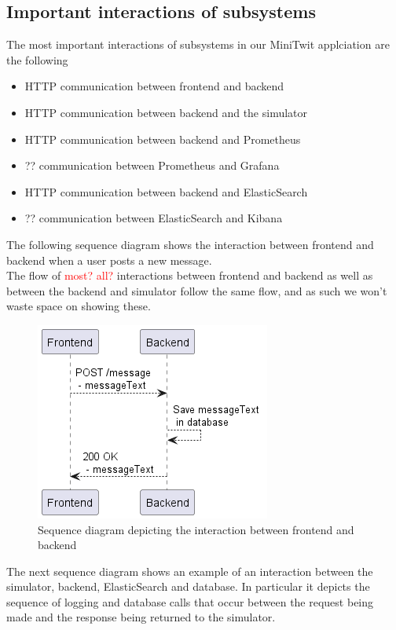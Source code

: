 \subsection{Important interactions of subsystems}
The most important interactions of subsystems in our MiniTwit applciation are the following 
\begin{itemize}
    \item HTTP communication between frontend and backend
    \item HTTP communication between backend and the simulator
    \item HTTP communication between backend and Prometheus
    \item ?? communication between Prometheus and Grafana
    \item HTTP communication between backend and ElasticSearch
    \item ?? communication between ElasticSearch and Kibana
\end{itemize}

The following sequence diagram shows the interaction between frontend and backend when a user posts a new message. \\
The flow of \textcolor{red}{most? all?} interactions between frontend and backend as well as between the backend and simulator follow the same flow, and as such we won't waste space on showing these. 

\begin{figure}[H]
 \centering
 \includegraphics[width = .5 \textwidth]{Images/frontend_backend_post_messages_sequence.png}
 \caption{Sequence diagram depicting the interaction between frontend and backend}
 \label{fig:SequenceDiagramPostMessage}
\end{figure}

The next sequence diagram shows an example of an interaction between the simulator, backend, ElasticSearch and database. In particular it depicts the sequence of logging and database calls that occur between the request being made and the response being returned to the simulator.

